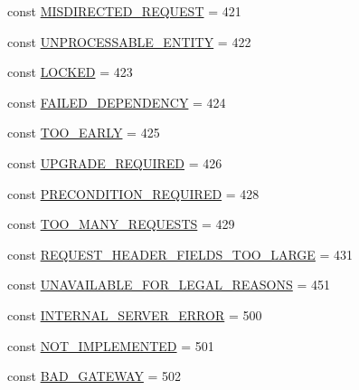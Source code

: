 \begin{DoxyCompactItemize}
\item 
const \hyperlink{classlibresignage_1_1api_1_1HTTPStatus_a2d1719e144190bcd3b931cd1b1c7f5f9}{M\+I\+S\+D\+I\+R\+E\+C\+T\+E\+D\+\_\+\+R\+E\+Q\+U\+E\+ST} = 421
\item 
const \hyperlink{classlibresignage_1_1api_1_1HTTPStatus_a51fd728a13b5ca7e1be1d2e51023c79f}{U\+N\+P\+R\+O\+C\+E\+S\+S\+A\+B\+L\+E\+\_\+\+E\+N\+T\+I\+TY} = 422
\item 
const \hyperlink{classlibresignage_1_1api_1_1HTTPStatus_a39fd5319b2b32d896b640ba12eac254a}{L\+O\+C\+K\+ED} = 423
\item 
const \hyperlink{classlibresignage_1_1api_1_1HTTPStatus_a3e5b4b444b1cdb77091500c4e544ea47}{F\+A\+I\+L\+E\+D\+\_\+\+D\+E\+P\+E\+N\+D\+E\+N\+CY} = 424
\item 
const \hyperlink{classlibresignage_1_1api_1_1HTTPStatus_a3907b87d03b9153c478a971d256c12d3}{T\+O\+O\+\_\+\+E\+A\+R\+LY} = 425
\item 
const \hyperlink{classlibresignage_1_1api_1_1HTTPStatus_a4ffa2c1ee145999625285452e5284c25}{U\+P\+G\+R\+A\+D\+E\+\_\+\+R\+E\+Q\+U\+I\+R\+ED} = 426
\item 
const \hyperlink{classlibresignage_1_1api_1_1HTTPStatus_aad8aa3503697b6aac987e0d2ba09f4fd}{P\+R\+E\+C\+O\+N\+D\+I\+T\+I\+O\+N\+\_\+\+R\+E\+Q\+U\+I\+R\+ED} = 428
\item 
const \hyperlink{classlibresignage_1_1api_1_1HTTPStatus_a928004f1bd2a71a367ab3cb3e3da458a}{T\+O\+O\+\_\+\+M\+A\+N\+Y\+\_\+\+R\+E\+Q\+U\+E\+S\+TS} = 429
\item 
const \hyperlink{classlibresignage_1_1api_1_1HTTPStatus_afe2a7424271b3f9290f2ed41c44fd5e4}{R\+E\+Q\+U\+E\+S\+T\+\_\+\+H\+E\+A\+D\+E\+R\+\_\+\+F\+I\+E\+L\+D\+S\+\_\+\+T\+O\+O\+\_\+\+L\+A\+R\+GE} = 431
\item 
const \hyperlink{classlibresignage_1_1api_1_1HTTPStatus_a72a81beba016f85e191c69ce76ab563f}{U\+N\+A\+V\+A\+I\+L\+A\+B\+L\+E\+\_\+\+F\+O\+R\+\_\+\+L\+E\+G\+A\+L\+\_\+\+R\+E\+A\+S\+O\+NS} = 451
\item 
const \hyperlink{classlibresignage_1_1api_1_1HTTPStatus_a273884af80676891854285fcd30d47dd}{I\+N\+T\+E\+R\+N\+A\+L\+\_\+\+S\+E\+R\+V\+E\+R\+\_\+\+E\+R\+R\+OR} = 500
\item 
const \hyperlink{classlibresignage_1_1api_1_1HTTPStatus_a7a82b68499cccf4c665f10652fe10f46}{N\+O\+T\+\_\+\+I\+M\+P\+L\+E\+M\+E\+N\+T\+ED} = 501
\item 
const \hyperlink{classlibresignage_1_1api_1_1HTTPStatus_a8785f2591ffd6e5bf5ef73c8e7ab4fde}{B\+A\+D\+\_\+\+G\+A\+T\+E\+W\+AY} = 502
\item 

\end{DoxyCompactItemize}
